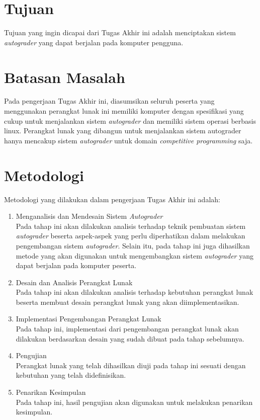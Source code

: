 \section{Tujuan}

\par Tujuan yang ingin dicapai dari Tugas Akhir ini adalah menciptakan sistem \textit{autograder} yang dapat berjalan pada komputer pengguna.

\section{Batasan Masalah}

\par Pada pengerjaan Tugas Akhir ini, diasumsikan seluruh peserta yang menggunakan perangkat lunak ini memiliki komputer dengan spesifikasi yang cukup untuk menjalankan sistem \textit{autograder} dan memiliki sistem operasi berbasis linux. Perangkat lunak yang dibangun untuk menjalankan sistem autograder hanya mencakup sistem \textit{autograder} untuk domain \textit{competitive programming} saja.

\section{Metodologi}

\par Metodologi yang dilakukan dalam pengerjaan Tugas Akhir ini adalah:
\begin{enumerate}
	\item Menganalisis dan Mendesain Sistem \textit{Autograder} \\ Pada tahap ini akan dilakukan analisis terhadap teknik pembuatan sistem \textit{autograder} beserta aspek-aspek yang perlu diperhatikan dalam melakukan pengembangan sistem \textit{autograder}. Selain itu, pada tahap ini juga dihasilkan metode yang akan digunakan untuk mengembangkan sistem \textit{autograder} yang dapat berjalan pada komputer peserta.
	\item Desain dan Analisis Perangkat Lunak \\ Pada tahap ini akan dilakukan analisis terhadap kebutuhan perangkat lunak beserta membuat desain perangkat lunak yang akan diimplementasikan.
	\item Implementasi Pengembangan Perangkat Lunak \\ Pada tahap ini, implementasi dari pengembangan perangkat lunak akan dilakukan berdasarkan desain yang sudah dibuat pada tahap sebelumnya.
	\item Pengujian \\ Perangkat lunak yang telah dihasilkan diuji pada tahap ini sesuati dengan kebutuhan yang telah didefinisikan.
	\item Penarikan Kesimpulan \\ Pada tahap ini, hasil pengujian akan digunakan untuk melakukan penarikan kesimpulan.
\end{enumerate}

